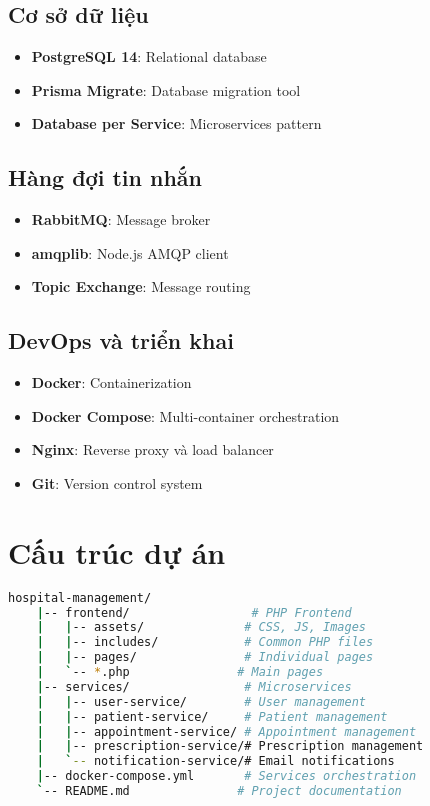 \documentclass[12pt,a4paper]{report}
\begin{document}
    \subsection{Cơ sở dữ liệu}
    \begin{itemize}
        \item \textbf{PostgreSQL 14}: Relational database
        \item \textbf{Prisma Migrate}: Database migration tool
        \item \textbf{Database per Service}: Microservices pattern
    \end{itemize}

    \subsection{Hàng đợi tin nhắn}
    \begin{itemize}
        \item \textbf{RabbitMQ}: Message broker
        \item \textbf{amqplib}: Node.js AMQP client
        \item \textbf{Topic Exchange}: Message routing
    \end{itemize}

    \subsection{DevOps và triển khai}
    \begin{itemize}
        \item \textbf{Docker}: Containerization
        \item \textbf{Docker Compose}: Multi-container orchestration
        \item \textbf{Nginx}: Reverse proxy và load balancer
        \item \textbf{Git}: Version control system
    \end{itemize}

    \section{Cấu trúc dự án}

    \begin{lstlisting}[language=bash]
    hospital-management/
    |-- frontend/                 # PHP Frontend
    |   |-- assets/              # CSS, JS, Images
    |   |-- includes/            # Common PHP files
    |   |-- pages/               # Individual pages
    |   `-- *.php               # Main pages
    |-- services/                # Microservices
    |   |-- user-service/        # User management
    |   |-- patient-service/     # Patient management
    |   |-- appointment-service/ # Appointment management
    |   |-- prescription-service/# Prescription management
    |   `-- notification-service/# Email notifications
    |-- docker-compose.yml       # Services orchestration
    `-- README.md               # Project documentation
    \end{lstlisting}
\end{document}
